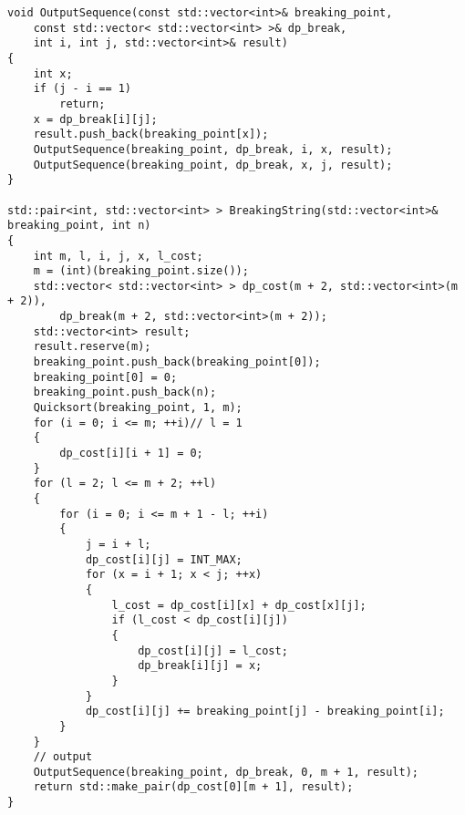 \begin{verbatim}
void OutputSequence(const std::vector<int>& breaking_point, 
    const std::vector< std::vector<int> >& dp_break,
    int i, int j, std::vector<int>& result)
{
    int x;
    if (j - i == 1)
        return;
    x = dp_break[i][j];
    result.push_back(breaking_point[x]);
    OutputSequence(breaking_point, dp_break, i, x, result);
    OutputSequence(breaking_point, dp_break, x, j, result);
}

std::pair<int, std::vector<int> > BreakingString(std::vector<int>& breaking_point, int n)
{
    int m, l, i, j, x, l_cost;
    m = (int)(breaking_point.size());
    std::vector< std::vector<int> > dp_cost(m + 2, std::vector<int>(m + 2)),
        dp_break(m + 2, std::vector<int>(m + 2));
    std::vector<int> result;
    result.reserve(m);
    breaking_point.push_back(breaking_point[0]);
    breaking_point[0] = 0;
    breaking_point.push_back(n);
    Quicksort(breaking_point, 1, m);
    for (i = 0; i <= m; ++i)// l = 1
    {
        dp_cost[i][i + 1] = 0;
    }
    for (l = 2; l <= m + 2; ++l)
    {
        for (i = 0; i <= m + 1 - l; ++i)
        {
            j = i + l;
            dp_cost[i][j] = INT_MAX;
            for (x = i + 1; x < j; ++x)
            {
                l_cost = dp_cost[i][x] + dp_cost[x][j];
                if (l_cost < dp_cost[i][j])
                {
                    dp_cost[i][j] = l_cost;
                    dp_break[i][j] = x;
                }
            }
            dp_cost[i][j] += breaking_point[j] - breaking_point[i];
        }
    }
    // output
    OutputSequence(breaking_point, dp_break, 0, m + 1, result);
    return std::make_pair(dp_cost[0][m + 1], result);
}
\end{verbatim}


